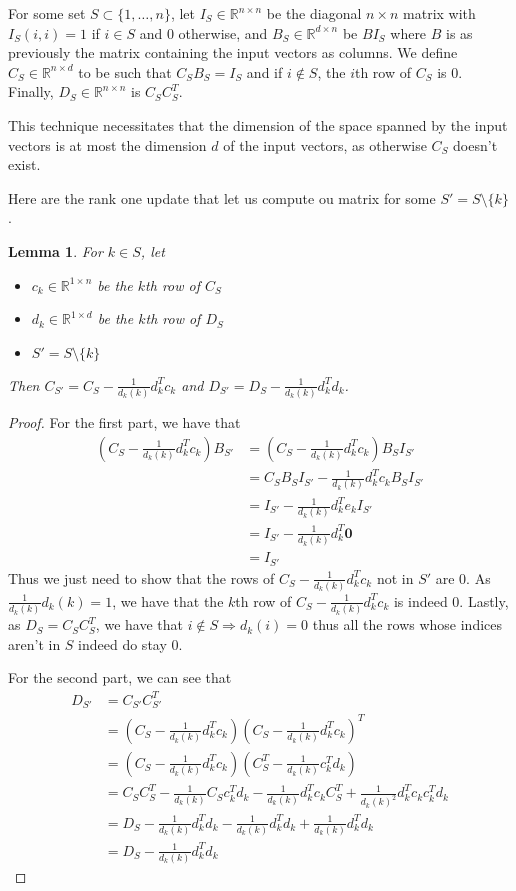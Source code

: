 \documentclass[12pt]{article}
\newtheorem{lemma}[theorem]{Lemma}
\begin{document}
For some set $S\subset\{1,\dots,n\}$, let $I_S\in\mathbb{R}^{n\times n}$ be the diagonal $n\times n$ matrix with $I_S(i,i) =1$ if $i\in S$ and $0$ otherwise, and $B_S\in\mathbb{R}^{d\times n}$ be $BI_S$ where $B$ is as previously the matrix containing the input vectors as columns. We define $C_S\in\mathbb{R}^{n\times d}$ to be such that $C_SB_S=I_S$ and if $i\not\in S$, the $i$th row of $C_S$ is $0$. Finally, $D_S\in\mathbb{R}^{n\times n}$ is $C_SC_S^T$.

This technique necessitates that the dimension of the space spanned by the input vectors is at most the dimension $d$ of the input vectors, as otherwise $C_S$ doesn't exist. %

Here are the rank one update that let us compute ou matrix for some $S'=S\setminus\{k\}$.
\begin{lemma}\label{update_lemma}
For $k\in S$, let 
\begin{itemize}
\item $c_k\in\mathbb{R}^{1\times n}$ be the $k$th row of $C_S$
\item $d_k\in\mathbb{R}^{1\times d}$ be the $k$th row of $D_S$
\item $S'= S\setminus\{k\}$
\end{itemize}
Then $C_{S'}=C_S-\frac{1}{d_k(k)}d_k^Tc_k$ and $D_{S'}=D_S-\frac{1}{d_k(k)}d_k^Td_k$.
\end{lemma}
\begin{proof}
For the first part, we have that\begin{align*}
\left(C_S-\frac{1}{d_k(k)}d_k^Tc_k\right)B_{S'}&=\left(C_S-\frac{1}{d_k(k)}d_k^Tc_k\right)B_{S}I_{S'}\\
&=C_SB_SI_{S'}-\frac{1}{d_k(k)}d_k^Tc_kB_{S}I_{S'}\\
&=I_{S'}-\frac{1}{d_k(k)}d_k^Te_kI_{S'}\\
&=I_{S'}-\frac{1}{d_k(k)}d_k^T\textbf{0}\\
&=I_{S'}\end{align*}
Thus we just need to show that the rows of $C_S-\frac{1}{d_k(k)}d_k^Tc_k$ not in $S'$ are 0. As $\frac{1}{d_k(k)}d_k(k)=1$, we have that the $k$th row of $C_S-\frac{1}{d_k(k)}d_k^Tc_k$ is indeed 0. Lastly, as $D_S=C_SC_S^T$, we have that $i\not\in S\Rightarrow d_k(i)=0$ thus all the rows whose indices aren't in $S$ indeed do stay 0.

For the second part, we can see that \begin{align*}
D_{S'}&=C_{S'}C_{S'}^T\\
&=\left(C_S-\frac{1}{d_k(k)}d_k^Tc_k\right)\left(C_S-\frac{1}{d_k(k)}d_k^Tc_k\right)^T\\
&=\left(C_S-\frac{1}{d_k(k)}d_k^Tc_k\right)\left(C_S^T-\frac{1}{d_k(k)}c_k^Td_k\right)\\
&=C_SC_S^T-\frac{1}{d_k(k)}C_Sc_k^Td_k-\frac{1}{d_k(k)}d_k^Tc_kC_S^T+\frac{1}{d_k(k)^2}d_k^Tc_kc_k^Td_k\\
&=D_S-\frac{1}{d_k(k)}d_k^Td_k-\frac{1}{d_k(k)}d_k^Td_k+\frac{1}{d_k(k)}d_k^Td_k\\
&=D_S-\frac{1}{d_k(k)}d_k^Td_k\end{align*}\end{proof}
\end{document}
